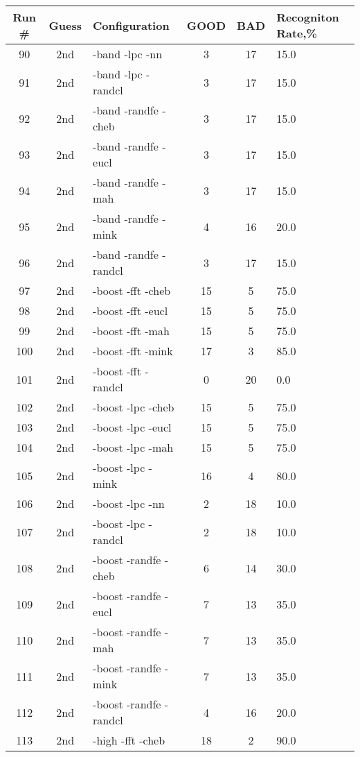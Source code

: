 \begin{table}
\centering
\begin{tabular}{|c|c|l|c|c|l|} \hline
Run \# & Guess & Configuration & GOOD & BAD & Recogniton Rate,\%\\ \hline\hline
90 & 2nd & -band -lpc -nn & 3 & 17 & 15.0\\ \hline
91 & 2nd & -band -lpc -randcl & 3 & 17 & 15.0\\ \hline
92 & 2nd & -band -randfe -cheb & 3 & 17 & 15.0\\ \hline
93 & 2nd & -band -randfe -eucl & 3 & 17 & 15.0\\ \hline
94 & 2nd & -band -randfe -mah & 3 & 17 & 15.0\\ \hline
95 & 2nd & -band -randfe -mink & 4 & 16 & 20.0\\ \hline
96 & 2nd & -band -randfe -randcl & 3 & 17 & 15.0\\ \hline
97 & 2nd & -boost -fft -cheb & 15 & 5 & 75.0\\ \hline
98 & 2nd & -boost -fft -eucl & 15 & 5 & 75.0\\ \hline
99 & 2nd & -boost -fft -mah & 15 & 5 & 75.0\\ \hline
100 & 2nd & -boost -fft -mink & 17 & 3 & 85.0\\ \hline
101 & 2nd & -boost -fft -randcl & 0 & 20 & 0.0\\ \hline
102 & 2nd & -boost -lpc -cheb & 15 & 5 & 75.0\\ \hline
103 & 2nd & -boost -lpc -eucl & 15 & 5 & 75.0\\ \hline
104 & 2nd & -boost -lpc -mah & 15 & 5 & 75.0\\ \hline
105 & 2nd & -boost -lpc -mink & 16 & 4 & 80.0\\ \hline
106 & 2nd & -boost -lpc -nn & 2 & 18 & 10.0\\ \hline
107 & 2nd & -boost -lpc -randcl & 2 & 18 & 10.0\\ \hline
108 & 2nd & -boost -randfe -cheb & 6 & 14 & 30.0\\ \hline
109 & 2nd & -boost -randfe -eucl & 7 & 13 & 35.0\\ \hline
110 & 2nd & -boost -randfe -mah & 7 & 13 & 35.0\\ \hline
111 & 2nd & -boost -randfe -mink & 7 & 13 & 35.0\\ \hline
112 & 2nd & -boost -randfe -randcl & 4 & 16 & 20.0\\ \hline
113 & 2nd & -high -fft -cheb & 18 & 2 & 90.0\\ \hline

\end{tabular}
\end{table}
